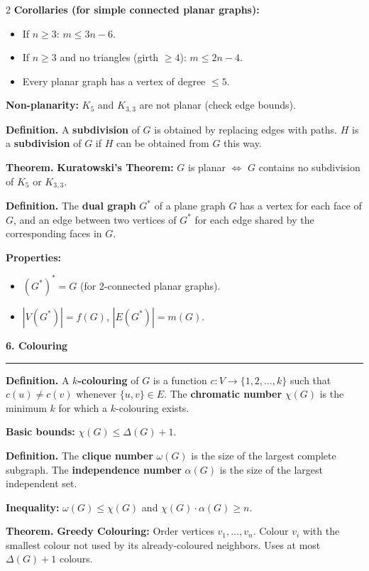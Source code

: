 \documentclass[8pt,landscape,a4paper]{extarticle}
\newcommand{\thm}[1]{\begin{mdframed}[style=theorembox]\textbf{Theorem.} #1\end{mdframed}}
\newcommand{\defn}[1]{\begin{mdframed}[style=defbox]\textbf{Definition.} #1\end{mdframed}}
\newcommand{\heading}[1]{\vspace{1pt}\noindent\textbf{\large #1}\vspace{1pt}\hrule\vspace{2pt}}
\begin{document}
\begin{multicols}{2}
\textbf{Corollaries (for simple connected planar graphs):}
\begin{itemize}[nosep]
    \item If $n \geq 3$: $m \leq 3n - 6$.
    \item If $n \geq 3$ and no triangles (girth $\geq 4$): $m \leq 2n - 4$.
    \item Every planar graph has a vertex of degree $\leq 5$.
\end{itemize}

\textbf{Non-planarity:} $K_5$ and $K_{3,3}$ are not planar (check edge bounds).

\defn{A \textbf{subdivision} of $G$ is obtained by replacing edges with paths. $H$ is a \textbf{subdivision} of $G$ if $H$ can be obtained from $G$ this way.}

\thm{\textbf{Kuratowski's Theorem:} $G$ is planar $\iff$ $G$ contains no subdivision of $K_5$ or $K_{3,3}$.}

\defn{The \textbf{dual graph} $G^*$ of a plane graph $G$ has a vertex for each face of $G$, and an edge between two vertices of $G^*$ for each edge shared by the corresponding faces in $G$.}

\textbf{Properties:}
\begin{itemize}[nosep]
    \item $(G^*)^* = G$ (for 2-connected planar graphs).
    \item $|V(G^*)| = f(G)$, $|E(G^*)| = m(G)$.
\end{itemize}

\heading{6. Colouring}

\defn{A \textbf{$k$-colouring} of $G$ is a function $c: V \to \{1,2,\ldots,k\}$ such that $c(u) \neq c(v)$ whenever $\{u,v\} \in E$. The \textbf{chromatic number} $\chi(G)$ is the minimum $k$ for which a $k$-colouring exists.}

\textbf{Basic bounds:} $\chi(G) \leq \Delta(G) + 1$.

\defn{The \textbf{clique number} $\omega(G)$ is the size of the largest complete subgraph. The \textbf{independence number} $\alpha(G)$ is the size of the largest independent set.}

\textbf{Inequality:} $\omega(G) \leq \chi(G)$ and $\chi(G) \cdot \alpha(G) \geq n$.

\thm{\textbf{Greedy Colouring:} Order vertices $v_1, \ldots, v_n$. Colour $v_i$ with the smallest colour not used by its already-coloured neighbors. Uses at most $\Delta(G) + 1$ colours.}


\end{multicols}
\end{document}

